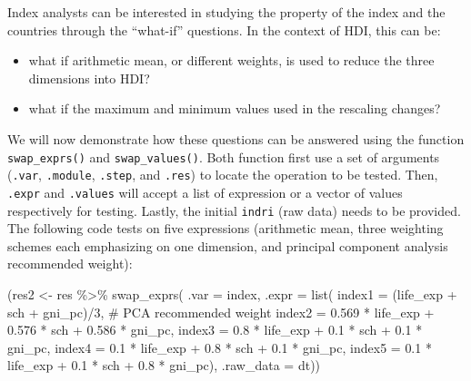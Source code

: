 \documentclass[
]{article}
\newenvironment{Shaded}{\begin{snugshade}}{\end{snugshade}}
\newcommand{\AttributeTok}[1]{\textcolor[rgb]{0.40,0.45,0.13}{#1}}
\newcommand{\CommentTok}[1]{\textcolor[rgb]{0.37,0.37,0.37}{#1}}
\newcommand{\DecValTok}[1]{\textcolor[rgb]{0.68,0.00,0.00}{#1}}
\newcommand{\FloatTok}[1]{\textcolor[rgb]{0.68,0.00,0.00}{#1}}
\newcommand{\FunctionTok}[1]{\textcolor[rgb]{0.28,0.35,0.67}{#1}}
\newcommand{\NormalTok}[1]{\textcolor[rgb]{0.00,0.23,0.31}{#1}}
\newcommand{\OtherTok}[1]{\textcolor[rgb]{0.00,0.23,0.31}{#1}}
\newcommand{\SpecialCharTok}[1]{\textcolor[rgb]{0.37,0.37,0.37}{#1}}
\providecommand{\tightlist}{%
  \setlength{\itemsep}{0pt}\setlength{\parskip}{0pt}}\usepackage{longtable,booktabs,array}
\begin{document}
Index analysts can be interested in studying the property of the index
and the countries through the ``what-if'' questions. In the context of
HDI, this can be:

\begin{itemize}
\tightlist
\item
  what if arithmetic mean, or different weights, is used to reduce the
  three dimensions into HDI?
\item
  what if the maximum and minimum values used in the rescaling changes?
\end{itemize}

We will now demonstrate how these questions can be answered using the
function \texttt{swap\_exprs()} and \texttt{swap\_values()}. Both
function first use a set of arguments (\texttt{.var}, \texttt{.module},
\texttt{.step}, and \texttt{.res}) to locate the operation to be tested.
Then, \texttt{.expr} and \texttt{.values} will accept a list of
expression or a vector of values respectively for testing. Lastly, the
initial \texttt{indri} (raw data) needs to be provided. The following
code tests on five expressions (arithmetic mean, three weighting schemes
each emphasizing on one dimension, and principal component analysis
recommended weight):

\begin{Shaded}
\begin{Highlighting}[]
\NormalTok{(res2 }\OtherTok{\textless{}{-}}\NormalTok{ res }\SpecialCharTok{\%\textgreater{}\%}
  \FunctionTok{swap\_exprs}\NormalTok{(}
    \AttributeTok{.var =}\NormalTok{ index,}
    \AttributeTok{.expr =} \FunctionTok{list}\NormalTok{(}
      \AttributeTok{index1 =}\NormalTok{ (life\_exp }\SpecialCharTok{+}\NormalTok{ sch }\SpecialCharTok{+}\NormalTok{ gni\_pc)}\SpecialCharTok{/}\DecValTok{3}\NormalTok{,}
      \CommentTok{\# PCA recommended weight}
      \AttributeTok{index2 =} \FloatTok{0.569} \SpecialCharTok{*}\NormalTok{ life\_exp }\SpecialCharTok{+} \FloatTok{0.576} \SpecialCharTok{*}\NormalTok{ sch }\SpecialCharTok{+} \FloatTok{0.586} \SpecialCharTok{*}\NormalTok{ gni\_pc, }
      \AttributeTok{index3 =} \FloatTok{0.8} \SpecialCharTok{*}\NormalTok{ life\_exp }\SpecialCharTok{+} \FloatTok{0.1} \SpecialCharTok{*}\NormalTok{ sch }\SpecialCharTok{+} \FloatTok{0.1} \SpecialCharTok{*}\NormalTok{ gni\_pc,}
      \AttributeTok{index4 =} \FloatTok{0.1} \SpecialCharTok{*}\NormalTok{ life\_exp }\SpecialCharTok{+} \FloatTok{0.8} \SpecialCharTok{*}\NormalTok{ sch }\SpecialCharTok{+} \FloatTok{0.1} \SpecialCharTok{*}\NormalTok{ gni\_pc,}
      \AttributeTok{index5 =} \FloatTok{0.1} \SpecialCharTok{*}\NormalTok{ life\_exp }\SpecialCharTok{+} \FloatTok{0.1} \SpecialCharTok{*}\NormalTok{ sch }\SpecialCharTok{+} \FloatTok{0.8} \SpecialCharTok{*}\NormalTok{ gni\_pc),}
    \AttributeTok{.raw\_data =}\NormalTok{ dt))}
\end{Highlighting}
\end{Shaded}
\end{document}
